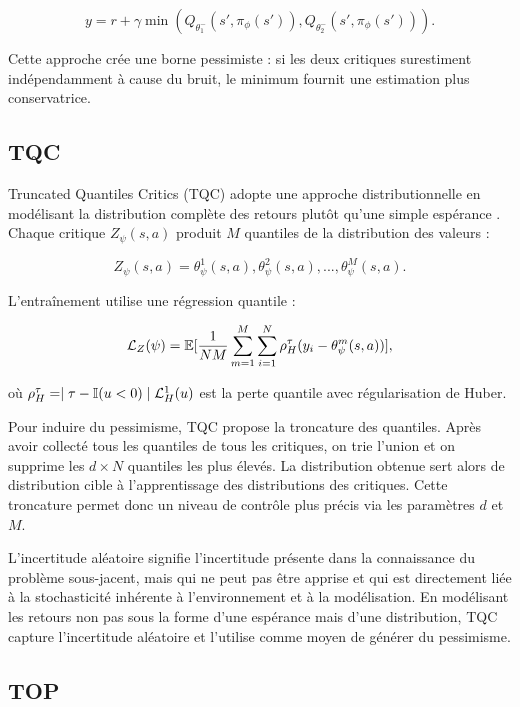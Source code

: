 \documentclass[a4paper, 12pt]{report}
\begin{document}
    $$
    y = r + \gamma \min (Q_{\theta^-_1} (s', \pi_{\phi} (s')), Q_{\theta^-_2} (s', \pi_{\phi} (s'))).
    $$

    Cette approche crée une borne pessimiste : si les deux critiques
    surestiment indépendamment à cause du bruit, le minimum fournit une
    estimation plus conservatrice.

    \subsection{TQC}

    Truncated Quantiles Critics (TQC) adopte une approche distributionnelle en
    modélisant la distribution complète des retours plutôt qu'une simple
    espérance \cite{kuznetsov2020controllingoverestimationbiastruncated}.
    Chaque critique $Z_\psi (s, a)$ produit $M$ quantiles de la distribution
    des valeurs :

    $$
    Z_\psi (s, a) = { \theta^1_\psi (s, a), \theta^2_\psi (s, a), ..., \theta^M_\psi (s, a)}.
    $$

    L'entraînement utilise une régression quantile
    \cite{dabney2017distributionalreinforcementlearningquantile} :

    $$
    {\cal{L}}_Z (\psi) = \mathbb{E} [ \frac{1}{N M} \sum_{m=1}^M \sum_{i=1}^N \rho^\tau_H (y_i - \theta^m_\psi (s, a)) ],
    $$

    où ${\rho^\tau_H} = \mid {\tau} - \mathbb{I} (u < 0) \mid {\cal{L}}^1_H
    (u)$ est la perte quantile avec régularisation de Huber.

    Pour induire du pessimisme, TQC propose la troncature des quantiles. Après
    avoir collecté tous les quantiles de tous les critiques, on trie l'union et
    on supprime les $d \times N$ quantiles les plus élevés. La distribution
    obtenue sert alors de distribution cible à l'apprentissage des
    distributions des critiques. Cette troncature permet donc un niveau de
    contrôle plus précis via les paramètres $d$ et $M$.

    L'incertitude aléatoire signifie l'incertitude présente dans la
    connaissance du problème sous-jacent, mais qui ne peut pas être apprise et
    qui est directement liée à la stochasticité inhérente à l'environnement et
    à la modélisation. En modélisant les retours non pas sous la forme d'une
    espérance mais d'une distribution, TQC capture l'incertitude aléatoire et
    l'utilise comme moyen de générer du pessimisme.

    \subsection{TOP}
\end{document}
